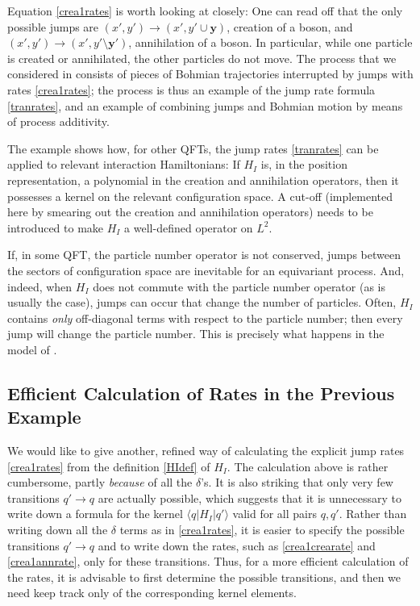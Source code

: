 \documentclass[12pt]{article}
\newcommand{\1}{\mathbf{1}} %
\renewcommand{\sp}[2]{\langle #1 | #2 \rangle} %
\newcommand{\vy}{{\boldsymbol y}}
\newcommand{\inter}{{I}} %
\begin{document}
Equation \eqref{crea1rates} is worth looking at closely: One can read
off that the only possible jumps are $(x',y') \to (x',y' \cup \vy)$,
creation of a boson, and $(x',y') \to (x',y' \setminus \vy')$,
annihilation of a boson. In particular, while one particle is created
or annihilated, the other particles do not move. The process that we
considered in \cite{crea1} consists of pieces of Bohmian trajectories
interrupted by jumps with rates \eqref{crea1rates}; the process is
thus an example of the jump rate formula \eqref{tranrates}, and an
example of combining jumps and Bohmian motion by means of process
additivity.

The example shows how, for other QFTs, the jump rates
\eqref{tranrates} can be applied to relevant interaction Hamiltonians:
If $H_\inter$ is, in the position representation, a polynomial in the
creation and annihilation operators, then it possesses a kernel on the
relevant configuration space. A cut-off (implemented here by smearing
out the creation and annihilation operators) needs to be introduced to
make $H_\inter$ a well-defined operator on $L^2$.

If, in some QFT, the particle number operator is not conserved, jumps
between the sectors of configuration space are inevitable for an
equivariant process. And, indeed, when $H_\inter$ does not commute
with the particle number operator (as is usually the case), jumps can
occur that change the number of particles. Often, $H_\inter$ contains
\emph{only} off-diagonal terms with respect to the particle number;
then every jump will change the particle number.  This is precisely
what happens in the model of \cite{crea1}.



\subsection{Efficient Calculation of Rates in the Previous Example}
\label{sec:efficient}

We would like to give another, refined way of calculating the explicit
jump rates \eqref{crea1rates} from the definition \eqref{HIdef} of
$H_\inter$. The calculation above is rather cumbersome, partly
\emph{because} of all the $\delta$'s.  It is also striking that only
very few transitions $q' \to q$ are actually possible, which suggests
that it is unnecessary to write down a formula for the kernel
$\sp{q}{H_\inter|q'}$ valid for all pairs $q,q'$. Rather than writing
down all the $\delta$ terms as in \eqref{crea1rates}, it is easier
to specify the possible transitions $q' \to q$ and to write down the
rates, such as \eqref{crea1crearate} and \eqref{crea1annrate}, only
for these transitions. Thus, for a more efficient calculation of the
rates, it is advisable to first determine the possible transitions,
and then we need keep track only of the corresponding kernel elements.
\end{document}
